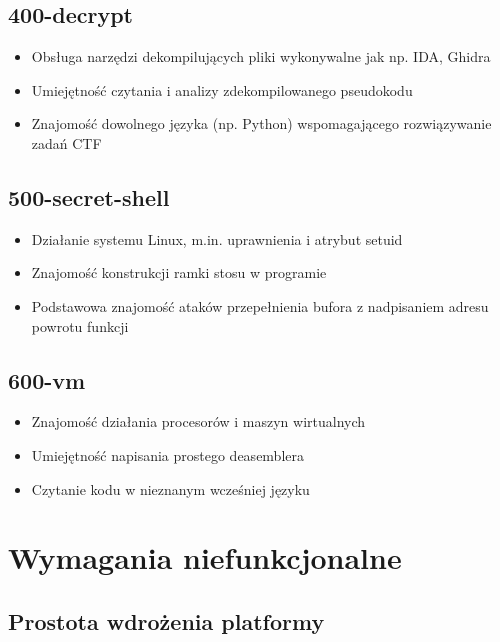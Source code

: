 \documentclass[language=polish,type=eng]{aghmodern}
\begin{document}
\subsection{400-decrypt}

\begin{itemize}
    \item Obsługa narzędzi dekompilujących pliki wykonywalne jak np. IDA, Ghidra
    \item Umiejętność czytania i analizy zdekompilowanego pseudokodu
    \item Znajomość dowolnego języka (np. Python) wspomagającego rozwiązywanie zadań CTF
\end{itemize}

\subsection{500-secret-shell}

\begin{itemize}
    \item Działanie systemu Linux, m.in. uprawnienia i atrybut setuid
    \item Znajomość konstrukcji ramki stosu w programie
    \item Podstawowa znajomość ataków przepełnienia bufora z nadpisaniem adresu powrotu funkcji
\end{itemize}

\subsection{600-vm}

\begin{itemize}
    \item Znajomość działania procesorów i maszyn wirtualnych
    \item Umiejętność napisania prostego deasemblera
    \item Czytanie kodu w nieznanym wcześniej języku
\end{itemize}

\section{Wymagania niefunkcjonalne}

\subsection{Prostota wdrożenia platformy}
\end{document}
